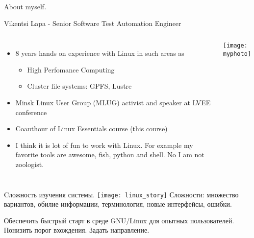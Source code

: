 \begin{frame}{About myself.}

    \large Vikentsi Lapa - Senior Software Test Automation Engineer
    \begin{columns}
            \begin{itemize}
                \item 8 years hands on experience with Linux in such areas as
                \begin{itemize}
                    \item High Perfomance Computing
                    \item Cluster file systems: GPFS, Lustre 
                \end{itemize}
                \item Minsk Linux User Group (MLUG) activist and speaker at LVEE conference
                \item Coauthour of Linux Essentials course (this course)
                \item I think it is lot of fun to work with Linux. For example my favorite tools are awesome, fish, python and shell. No I am not zoologist.
            \end{itemize}
            \center\texttt{[image: myphoto]}
    \end{columns}
\end{frame}

\begin{frame}{Cложность изучения системы.}
         \center\texttt{[image: linux\_story]} 
    \break
\pause
Сложности: множество вариантов, обилие информации, терминология, новые интерфейсы, ошибки.
\pause
	\begin{center}
		\large
		Обеспечить быстрый старт в среде GNU/Linux для опытных пользователей. Понизить порог вхождения. Задать направление. 
	\end{center} 
\end{frame}


